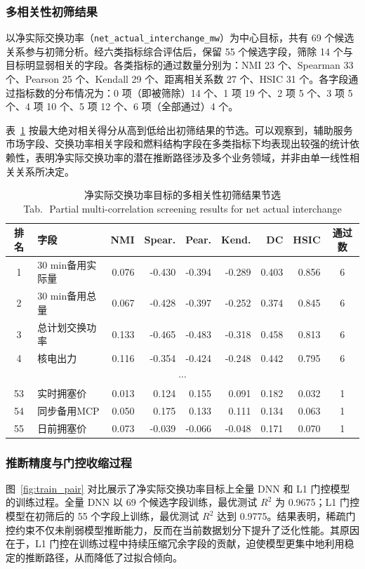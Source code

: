 \documentclass[UTF8,zihao=5,twoside]{ctexart}
\numberwithin{equation}{section}
\newcommand{\tabbicaption}[2]{%
  \caption{#1\\[-0.2em]\small Tab.\,\thetable\ #2}
}
\newcommand{\code}[1]{\texttt{#1}}
\begin{document}
\subsubsection{多相关性初筛结果}
以净实际交换功率（\code{net\_actual\_interchange\_mw}）为中心目标，共有 69 个候选关系参与初筛分析。经六类指标综合评估后，保留 55 个候选字段，筛除 14 个与目标明显弱相关的字段。各类指标的通过数量分别为：NMI 23 个、Spearman 33 个、Pearson 25 个、Kendall 29 个、距离相关系数 27 个、HSIC 31 个。各字段通过指标数的分布情况为：0 项（即被筛除）14 个、1 项 19 个、2 项 5 个、3 项 5 个、4 项 10 个、5 项 12 个、6 项（全部通过）4 个。

表~\ref{tab:screening_top} 按最大绝对相关得分从高到低给出初筛结果的节选。可以观察到，辅助服务市场字段、交换功率相关字段和燃料结构字段在多类指标下均表现出较强的统计依赖性，表明净实际交换功率的潜在推断路径涉及多个业务领域，并非由单一线性相关关系所决定。

\begin{table}[!tbp]
\centering
\scriptsize
\setlength{\tabcolsep}{1pt}
\tabbicaption{净实际交换功率目标的多相关性初筛结果节选}{Partial multi-correlation screening results for net actual interchange}
\label{tab:screening_top}
\begin{tabularx}{\columnwidth}{cXrrrrrrc}
\toprule
排名 & 字段 & NMI & Spear. & Pear. & Kend. & DC & HSIC & 通过数 \\
\midrule
1 & 30 min备用实际量 & 0.076 & -0.430 & -0.394 & -0.289 & 0.403 & 0.856 & 6 \\
2 & 30 min备用总量 & 0.067 & -0.428 & -0.397 & -0.252 & 0.374 & 0.845 & 6 \\
3 & 总计划交换功率 & 0.133 & -0.465 & -0.483 & -0.318 & 0.458 & 0.813 & 6 \\
4 & 核电出力 & 0.116 & -0.354 & -0.424 & -0.248 & 0.442 & 0.795 & 6 \\
\multicolumn{9}{c}{\(\cdots\)} \\
53 & 实时拥塞价 & 0.013 & 0.124 & 0.155 & 0.091 & 0.182 & 0.032 & 1 \\
54 & 同步备用MCP & 0.050 & 0.175 & 0.133 & 0.111 & 0.134 & 0.063 & 1 \\
55 & 日前拥塞价 & 0.073 & -0.039 & -0.066 & -0.048 & 0.171 & 0.070 & 1 \\
\bottomrule
\end{tabularx}
\end{table}

\subsubsection{推断精度与门控收缩过程}
图~\ref{fig:train_pair} 对比展示了净实际交换功率目标上全量 DNN 和 L1 门控模型的训练过程。全量 DNN 以 69 个候选字段训练，最优测试 $R^2$ 为 0.9675；L1 门控模型在初筛后的 55 个字段上训练，最优测试 $R^2$ 达到 0.9775。结果表明，稀疏门控约束不仅未削弱模型推断能力，反而在当前数据划分下提升了泛化性能。其原因在于，L1 门控在训练过程中持续压缩冗余字段的贡献，迫使模型更集中地利用稳定的推断路径，从而降低了过拟合倾向。
\end{document}
